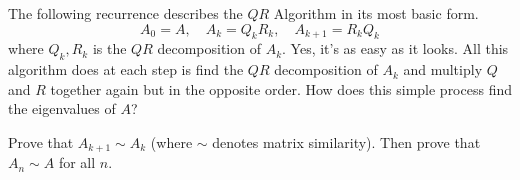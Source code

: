 %
%
%
%
%
%

The following recurrence describes the $QR$ Algorithm in its most basic form. 
\begin{equation*}
A_0 = A, \quad A_k = Q_k R_k, \quad A_{k+1} = R_k Q_k
\end{equation*}
where $Q_k, R_k$ is the $QR$ decomposition of $A_k$. Yes, it's as easy as it looks. All this algorithm does at each step is find the $QR$ decomposition of $A_k$ and multiply $Q$ and $R$ together again but in the opposite order. How does this simple process find the eigenvalues of $A$? 

\begin{problem}
\label{problem:similarity proof}
Prove that $A_{k+1} \sim A_k$ (where $\sim$ denotes matrix similarity). Then prove that $A_n \sim A$ for all $n$.  
\end{problem}

